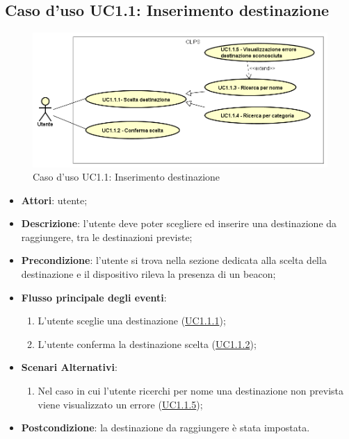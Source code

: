\documentclass[../AnalisiDeiRequisiti.tex]{subfiles}
\begin{document}
\subsection{Caso d'uso UC1.1: Inserimento destinazione}

        \begin{figure}[!h]
            \centering
            \includegraphics[scale=0.95, width=\textwidth]{img/UC1-1.png}
            \caption{Caso d'uso UC1.1: Inserimento destinazione}\label{fig:UC1.1} 
        \end{figure}
\begin{itemize}
\item \textbf{Attori}: utente;
\item \textbf{Descrizione}: l'utente deve poter scegliere ed inserire una destinazione da raggiungere, tra le destinazioni previste; 
      \item \textbf{Precondizione}: l'utente si trova nella sezione dedicata alla scelta della destinazione e il dispositivo rileva la presenza di un beacon;

        \item \textbf{Flusso principale degli eventi}:
          \begin{enumerate}
          \item L'utente sceglie una destinazione  (\hyperlink{UC1.1.1}{UC1.1.1});
          \item L'utente conferma la destinazione scelta  (\hyperlink{UC1.1.2}{UC1.1.2});

      \end{enumerate}
    \item \textbf{Scenari Alternativi}:
      \begin{enumerate}
          \item Nel caso in cui l'utente ricerchi per nome una destinazione non prevista viene visualizzato un errore (\hyperlink{UC1.1.5}{UC1.1.5});

      \end{enumerate}
    \item \textbf{Postcondizione}: la destinazione da raggiungere è stata impostata.
  \end{itemize}
\hypertarget{UC1.1.1}{}
\end{document}
